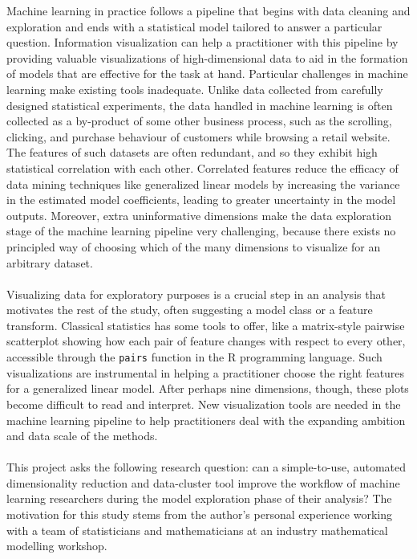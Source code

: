\documentclass{sigchi}
\begin{document}
Machine learning in practice follows a pipeline that begins with data cleaning and exploration and ends with a statistical model tailored to answer a particular question. %
%
Information visualization can help a practitioner with this pipeline by providing valuable visualizations of high-dimensional data to aid in the formation of models that are effective for the task at hand. %
%
Particular challenges in machine learning make existing tools inadequate. %
Unlike data collected from carefully designed statistical experiments, the data handled in machine learning is often collected as a by-product of some other business process, such as the scrolling, clicking, and purchase behaviour of customers while browsing a retail website. %
The features of such datasets are often redundant, and so they exhibit high statistical correlation with each other. %
%
Correlated features reduce the efficacy of data mining techniques like generalized linear models by increasing the variance in the estimated model coefficients, leading to greater uncertainty in the model outputs. %
%
Moreover, extra uninformative dimensions make the data exploration stage of the machine learning pipeline very challenging, because there exists no principled way of choosing which of the many dimensions to visualize for an arbitrary dataset. %
%
\\\\
%
Visualizing data for exploratory purposes is a crucial step in an analysis that motivates the rest of the study, often suggesting a model class or a feature transform. %
%
Classical statistics has some tools to offer, like a matrix-style pairwise scatterplot showing how each pair of feature changes with respect to every other, accessible through the \texttt{pairs} function in the R programming language. %
%
Such visualizations are instrumental in helping a practitioner choose the right features for a generalized linear model. %
%
After perhaps nine dimensions, though, these plots become difficult to read and interpret. %
New visualization tools are needed in the machine learning pipeline to help practitioners deal with the expanding ambition and data scale of the methods. %
%
\\\\
%
This project asks the following research question: can a simple-to-use, automated dimensionality reduction and data-cluster tool improve the workflow of machine learning researchers during the model exploration phase of their analysis? %
%
The motivation for this study stems from the author's personal experience working with a team of statisticians and mathematicians at an industry mathematical modelling workshop. %
\end{document}
